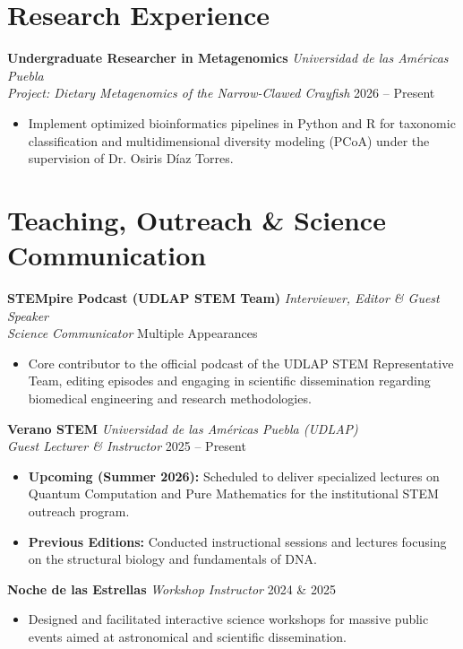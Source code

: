 \documentclass[10pt,letterpaper]{article}
\begin{document}
\section{Research Experience}

\textbf{Undergraduate Researcher in Metagenomics} \hfill \textit{Universidad de las Am\'ericas Puebla} \\
\textit{Project: Dietary Metagenomics of the Narrow-Clawed Crayfish} \hfill 2026 -- Present
\begin{itemize}
    \item Implement optimized bioinformatics pipelines in Python and R for taxonomic classification and multidimensional diversity modeling (PCoA) under the supervision of Dr. Osiris D\'iaz Torres.
\end{itemize}
\newpage 
\section{Teaching, Outreach \& Science Communication}

\textbf{STEMpire Podcast (UDLAP STEM Team)} \hfill \textit{Interviewer, Editor \& Guest Speaker} \\
\textit{Science Communicator} \hfill Multiple Appearances
\begin{itemize}
    \item Core contributor to the official podcast of the UDLAP STEM Representative Team, editing episodes and engaging in scientific dissemination regarding biomedical engineering and research methodologies.
\end{itemize}

\textbf{Verano STEM} \hfill \textit{Universidad de las Am\'ericas Puebla (UDLAP)} \\
\textit{Guest Lecturer \& Instructor} \hfill 2025 -- Present
\begin{itemize}
    \item \textbf{Upcoming (Summer 2026):} Scheduled to deliver specialized lectures on Quantum Computation and Pure Mathematics for the institutional STEM outreach program.
    \item \textbf{Previous Editions:} Conducted instructional sessions and lectures focusing on the structural biology and fundamentals of DNA.
\end{itemize}

\textbf{Noche de las Estrellas} \hfill \textit{Workshop Instructor} \hfill 2024 \& 2025
\begin{itemize}
    \item Designed and facilitated interactive science workshops for massive public events aimed at astronomical and scientific dissemination.
\end{itemize}
\end{document}
